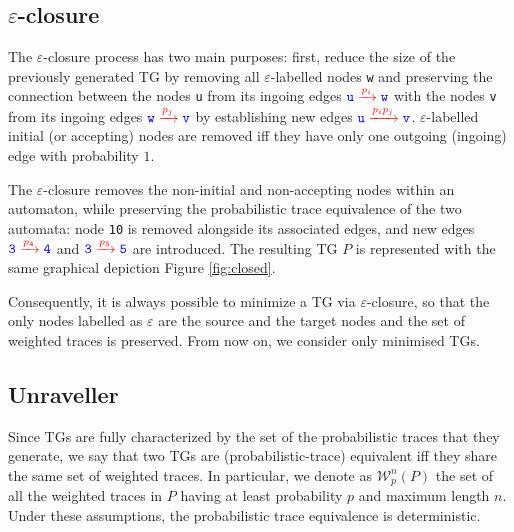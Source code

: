 \subsection{$\varepsilon$-closure}\label{sec:clos}
The $\varepsilon$-closure process has two main purposes: first, reduce the size of the previously generated TG by removing all 
$\varepsilon$-labelled nodes \texttt{\color{blue}w} and preserving the connection between  the nodes \texttt{\color{blue}u} 
from its ingoing edges   $\texttt{\color{blue}u}\xrightarrow{\color{red}p_i}\texttt{\color{blue}w}$ with the nodes \texttt{\color{blue}v} from its ingoing edges   $\texttt{\color{blue}w}\xrightarrow{\color{red}p_j}\texttt{\color{blue}v}$ by establishing new edges $\texttt{\color{blue}u}\xrightarrow{\color{red}p_ip_j}\texttt{\color{blue}v}$. $\varepsilon$-labelled initial (or accepting) nodes are removed iff they have only one outgoing (ingoing) edge with probability $1$.

\begin{example}
	The $\varepsilon$-closure removes the non-initial and non-accepting nodes within an automaton, while preserving the probabilistic trace equivalence of the two automata: node \texttt{\color{blue}10} is removed alongside its associated edges, and new edges $\texttt{\color{blue}3}\xrightarrow{\color{red}p_4}\texttt{\color{blue}4}$ and $\texttt{\color{blue}3}\xrightarrow{\color{red}p_5}\texttt{\color{blue}5}$ are introduced. The resulting TG $P$ is represented with the same graphical depiction Figure \ref{fig:closed}.
\end{example}
%
Consequently, it is always possible to minimize a TG  via $\varepsilon$-closure, so that the only nodes labelled as $\varepsilon$ 
are the source and the target nodes and the set of weighted traces is preserved. From now on, we consider only minimised TGs. 

\subsection{Unraveller}\label{sec:unrav}
Since TGs are fully characterized by the set of the probabilistic traces that they generate,  we say that two TGs are 
(probabilistic-trace) equivalent iff they share the same set of weighted traces. In particular, we denote as $\mathcal{W}_p^n(P)$ the set of all the weighted traces in $P$ having at least probability $p$ and maximum length $n$. Under these assumptions, the probabilistic trace equivalence is deterministic.

